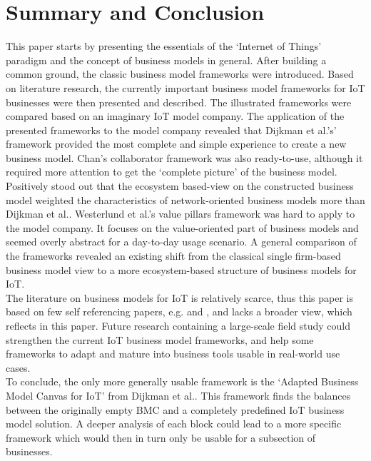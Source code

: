 \section{Summary and Conclusion}
\vspace{-1em}
\label{sec:summary}
	This paper starts by presenting the essentials of the `Internet of Things' paradigm and the concept of business models in general. After building a common ground, the classic business model frameworks were introduced. Based on literature research, the currently important business model frameworks for IoT businesses were then presented and described. The illustrated frameworks were compared based on an imaginary IoT model company. The application of the presented frameworks to the model company revealed that Dijkman et al.'s' framework provided the most complete and simple experience to create a new business model. Chan's collaborator framework was also ready-to-use, although it required more attention to get the `complete picture' of the business model. Positively stood out that the ecosystem based-view on the constructed business model weighted the characteristics of network-oriented business models more than Dijkman et al.. Westerlund et al.'s value pillars framework was hard to apply to the model company. It focuses on the value-oriented part of business models and seemed overly abstract for a day-to-day usage scenario. A general comparison of the frameworks revealed an existing shift from the classical single firm-based business model view to a more ecosystem-based structure of business models for IoT. \\
	The literature on business models for IoT is relatively scarce, thus this paper is based on few self referencing papers, e.g. \cite{ju} and \cite{dijkman}, and lacks a broader view, which reflects in this paper. Future research containing a large-scale field study could strengthen the current IoT business model frameworks, and help some frameworks to adapt and mature into business tools usable in real-world use cases.\\
	To conclude, the only more generally usable framework is the `Adapted Business Model Canvas for IoT' from Dijkman et al.. This framework finds the balances between the originally empty BMC and a completely predefined IoT business model solution. A deeper analysis of each block could lead to a more specific framework which would then in turn only be usable for a subsection of businesses.
	\vspace{-10em}
